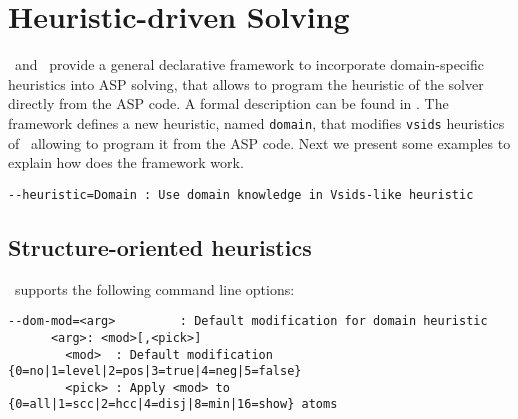 

\section{Heuristic-driven Solving}
\label{sec:heuristic}


%
%
%


\clasp\ and \clingo\ provide a general declarative framework to incorporate domain-specific heuristics into ASP solving,  
that allows to program the heuristic of the solver directly from the ASP code.
A formal description can be found in \cite{gekaotroscwa13a}.
The framework defines a new heuristic, named \texttt{domain},
that modifies \texttt{vsids} heuristics of \clasp\ allowing to program it from the ASP code.
Next we present some examples to explain how does the framework work.

\begin{lstlisting}[numbers=none]
 --heuristic=Domain : Use domain knowledge in Vsids-like heuristic
\end{lstlisting}

\subsection{Structure-oriented heuristics}
\tbf


\clasp\ supports the following command line options:
\begin{lstlisting}[numbers=none]
 --dom-mod=<arg>         : Default modification for domain heuristic
      <arg>: <mod>[,<pick>]
        <mod>  : Default modification {0=no|1=level|2=pos|3=true|4=neg|5=false}
        <pick> : Apply <mod> to {0=all|1=scc|2=hcc|4=disj|8=min|16=show} atoms
\end{lstlisting}


